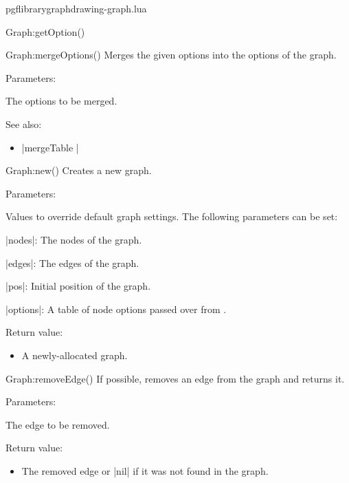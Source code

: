 \begin{filedescription}{pgflibrarygraphdrawing-graph.lua}
\begin{luacommand}{{Graph:getOption}()}
\end{luacommand}\begin{luacommand}{{Graph:mergeOptions}()}
Merges the given options into the options of the graph. 

Parameters:
\begin{parameterdescription}
	\item[\meta{options}] The options to be merged. 
\end{parameterdescription}



See also:
\begin{itemize}
	\item[] |mergeTable |
\end{itemize}

\end{luacommand}\begin{luacommand}{{Graph:new}()}
Creates a new graph. 

Parameters:
\begin{parameterdescription}
	\item[\meta{values}] Values to override default graph settings. The following parameters can be set:\par |nodes|: The nodes of the graph.\par |edges|: The edges of the graph.\par |pos|: Initial position of the graph.\par |options|: A table of node options passed over from \tikzname. 
\end{parameterdescription}


Return value:
\begin{itemize} \item[] A newly-allocated graph.  \end{itemize}


\end{luacommand}\begin{luacommand}{{Graph:removeEdge}()}
If possible, removes an edge from the graph and returns it. 

Parameters:
\begin{parameterdescription}
	\item[\meta{edge}] The edge to be removed. 
\end{parameterdescription}


Return value:
\begin{itemize} \item[] The removed edge or |nil| if it was not found in the graph.  \end{itemize}



\end{luacommand}
\end{filedescription}
